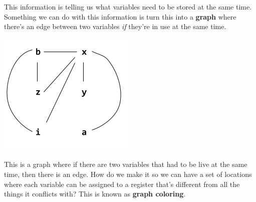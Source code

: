 \documentclass[letterpaper]{article}
\begin{document}
This information is telling us what variables need to be stored at the same time. Something we can do with this information is turn this into a \textbf{graph} where there's an edge between two variables \emph{if} they're in use at the same time. 
\begin{center}
    \includegraphics[scale=0.6]{../assets/loc_use1.png}
\end{center}
This is a graph where if there are two variables that had to be live at the same time, then there is an edge. How do we make it so we can have a set of locations where each variable can be assigned to a register that's different from all the things it conflicts with? This is known as \textbf{graph coloring}.
\end{document}
